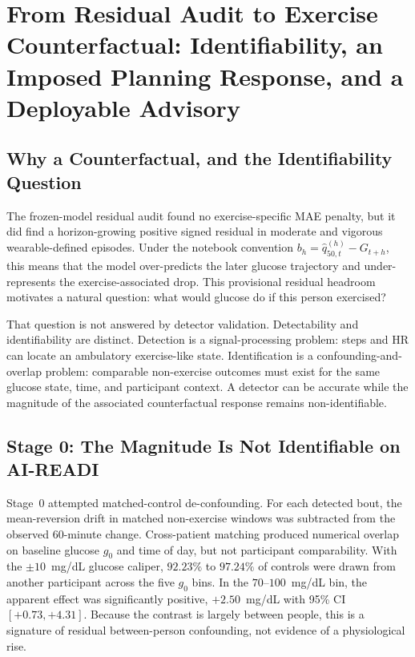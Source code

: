 
\section{From Residual Audit to Exercise Counterfactual: Identifiability, an Imposed Planning Response, and a Deployable Advisory}
\label{sec:exercise_counterfactual}

\subsection{Why a Counterfactual, and the Identifiability Question}
\label{subsec:ex_cf_question}

The frozen-model residual audit found no exercise-specific MAE penalty, but it
did find a horizon-growing positive signed residual in moderate and vigorous
wearable-defined episodes. Under the notebook convention
$b_h=\hat q_{50,t}^{(h)}-G_{t+h}$, this means that the model over-predicts the
later glucose trajectory and under-represents the exercise-associated drop.
This provisional residual headroom motivates a natural question: what would
glucose do if this person exercised?

That question is not answered by detector validation. Detectability and
identifiability are distinct. Detection is a signal-processing problem:
steps and HR can locate an ambulatory exercise-like state. Identification is
a confounding-and-overlap problem: comparable non-exercise outcomes must exist
for the same glucose state, time, and participant context. A detector can be
accurate while the magnitude of the associated counterfactual response remains
non-identifiable.

\subsection{Stage 0: The Magnitude Is Not Identifiable on AI-READI}
\label{subsec:ex_stage0}

Stage~0 attempted matched-control de-confounding. For each detected bout, the
mean-reversion drift in matched non-exercise windows was subtracted from the
observed 60-minute change. Cross-patient matching produced numerical overlap
on baseline glucose $g_0$ and time of day, but not participant comparability.
With the $\pm10$~mg/dL glucose caliper, $92.23\%$ to $97.24\%$ of controls were
drawn from another participant across the five $g_0$ bins. In the
$70$--$100$~mg/dL bin, the apparent effect was significantly positive,
$+2.50$~mg/dL with 95\% CI $[+0.73,+4.31]$. Because the contrast is largely
between people, this is a signature of residual between-person confounding,
not evidence of a physiological rise.

